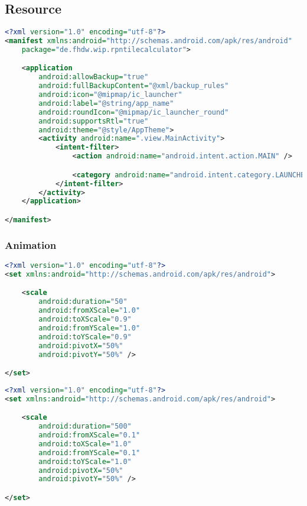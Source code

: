 \subsection{Resource}

\begin{lstlisting}[caption=AndroidManifest.xml,label=list:AndroidManifest.xml,language=XML]
<?xml version="1.0" encoding="utf-8"?>
<manifest xmlns:android="http://schemas.android.com/apk/res/android"
    package="de.fhdw.wip.rpntilecalculator">

    <application
        android:allowBackup="true"
        android:fullBackupContent="@xml/backup_rules"
        android:icon="@mipmap/ic_launcher"
        android:label="@string/app_name"
        android:roundIcon="@mipmap/ic_launcher_round"
        android:supportsRtl="true"
        android:theme="@style/AppTheme">
        <activity android:name=".view.MainActivity">
            <intent-filter>
                <action android:name="android.intent.action.MAIN" />

                <category android:name="android.intent.category.LAUNCHER" />
            </intent-filter>
        </activity>
    </application>

</manifest>
\end{lstlisting}    

\subsubsection{Animation}

\begin{lstlisting}[caption=button\_bounce.xml,label=list:button_bounce.xml,language=XML]
<?xml version="1.0" encoding="utf-8"?>
<set xmlns:android="http://schemas.android.com/apk/res/android">

    <scale
        android:duration="50"
        android:fromXScale="1.0"
        android:toXScale="0.9"
        android:fromYScale="1.0"
        android:toYScale="0.9"
        android:pivotX="50%"
        android:pivotY="50%" />

</set>
\end{lstlisting}    

\begin{lstlisting}[caption=button\_load.xml,label=list:button_load.xml,language=XML]
<?xml version="1.0" encoding="utf-8"?>
<set xmlns:android="http://schemas.android.com/apk/res/android">

    <scale
        android:duration="500"
        android:fromXScale="0.1"
        android:toXScale="1.0"
        android:fromYScale="0.1"
        android:toYScale="1.0"
        android:pivotX="50%"
        android:pivotY="50%" />

</set>
\end{lstlisting}    


